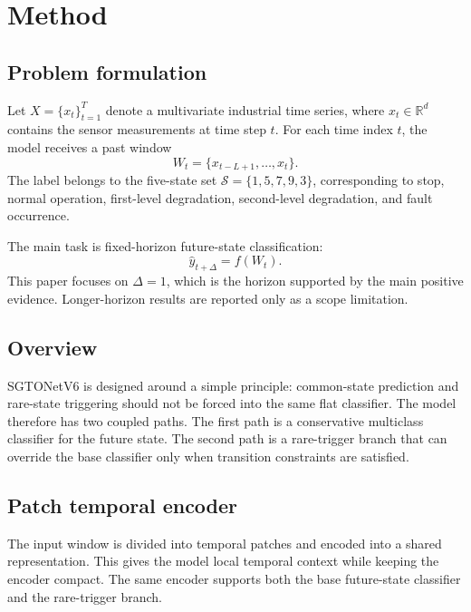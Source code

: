 \section{Method}
\label{sec:method}

\subsection{Problem formulation}

Let $X=\{x_t\}_{t=1}^{T}$ denote a multivariate industrial time series, where $x_t \in \mathbb{R}^{d}$ contains the sensor measurements at time step $t$. For each time index $t$, the model receives a past window
\begin{equation}
W_t = \{x_{t-L+1}, \ldots, x_t\}.
\end{equation}
The label belongs to the five-state set $\mathcal{S}=\{1,5,7,9,3\}$, corresponding to stop, normal operation, first-level degradation, second-level degradation, and fault occurrence.

The main task is fixed-horizon future-state classification:
\begin{equation}
\hat{y}_{t+\Delta} = f(W_t).
\end{equation}
This paper focuses on $\Delta=1$, which is the horizon supported by the main positive evidence. Longer-horizon results are reported only as a scope limitation.

\subsection{Overview}

SGTONetV6 is designed around a simple principle: common-state prediction and rare-state triggering should not be forced into the same flat classifier. The model therefore has two coupled paths. The first path is a conservative multiclass classifier for the future state. The second path is a rare-trigger branch that can override the base classifier only when transition constraints are satisfied.

\subsection{Patch temporal encoder}

The input window is divided into temporal patches and encoded into a shared representation. This gives the model local temporal context while keeping the encoder compact. The same encoder supports both the base future-state classifier and the rare-trigger branch.

